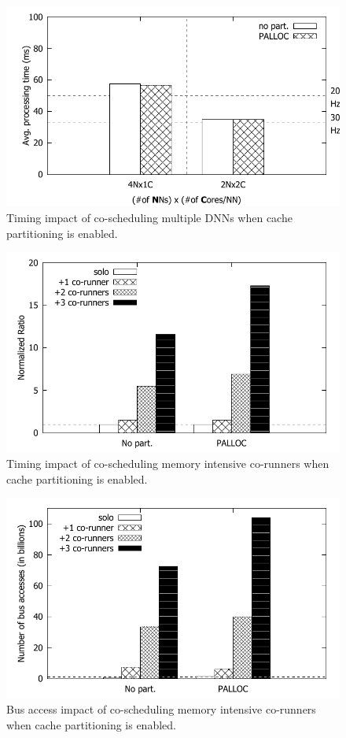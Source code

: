 \begin{figure}[h]
  \centering
  \includegraphics[width=.7\textwidth]{figs/palloc_multimodel}
  \caption{Timing impact of co-scheduling multiple DNNs when cache 
partitioning is enabled.}
  \label{fig:palloc_multimodel}
\end{figure}

\begin{figure}[h]
  \centering
  \includegraphics[width=.7\textwidth]{figs/palloc_bandwidth_exectime}
  \caption{Timing impact of co-scheduling memory intensive co-runners 
when cache partitioning is enabled.}
  \label{fig:palloc_bandwidth_exectime}
\end{figure}

\begin{figure}[h]
  \centering
  \includegraphics[width=.7\textwidth]{figs/palloc_bandwidth_bus}
  \caption{Bus access impact of co-scheduling memory intensive co-runners 
when cache partitioning is enabled.}
  \label{fig:palloc_bandwidth_bus}
\end{figure}

